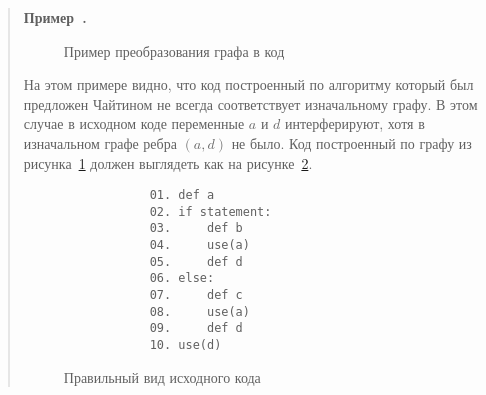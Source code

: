 \documentclass[12pt]{article}
\newcounter{example}
\newenvironment{example}[1][]{\refstepcounter{example}\par\medskip\noindent\begin{quote}
\textbf{Пример~\theexample. #1}\rmfamily}{\end{quote}\medskip}
\begin{document}
\begin{example}

    \begin{figure}
        \centering
    \caption{Пример преобразования графа в код}
    \label{fig:ex2}
    \end{figure}

    На этом примере видно, что код построенный по алгоритму который был предложен Чайтином не
    всегда соответствует изначальному графу. В этом случае в исходном коде переменные
    $a$ и $d$ интерферируют, хотя в изначальном графе ребра $(a, d)$ не было. Код построенный
    по графу из рисунка~\ref{fig:ex2} должен выглядеть как на рисунке~\ref{fig:right_ex2}.

    \begin{figure}
        \centering
        \lstset{basicstyle=\ttfamily\small, frame=single}
        \begin{lstlisting}
            01. def a
            02. if statement:
            03.     def b
            04.     use(a)
            05.     def d 
            06. else:
            07.     def c
            08.     use(a)
            09.     def d
            10. use(d)
        \end{lstlisting}
        \caption{Правильный вид исходного кода}
        \label{fig:right_ex2}
    \end{figure}
\end{example}
\end{document}
